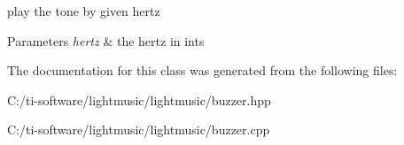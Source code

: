 play the tone by given hertz 


\begin{DoxyParams}{Parameters}
{\em hertz} & the hertz in ints \\
\hline
\end{DoxyParams}


The documentation for this class was generated from the following files\+:\begin{DoxyCompactItemize}
\item 
C\+:/ti-\/software/lightmusic/lightmusic/buzzer.\+hpp\item 
C\+:/ti-\/software/lightmusic/lightmusic/buzzer.\+cpp\end{DoxyCompactItemize}
